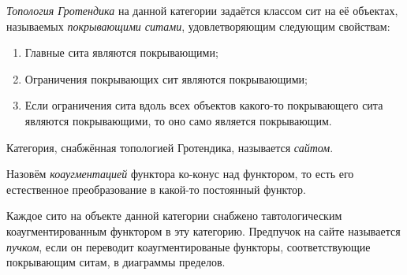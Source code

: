 \documentclass[
	extrafontsizes,
	11pt,
	hyphens,
]{memoir}
\begin{document}

\begin{definition}
\emph{Топология Гротендика} на данной категории задаётся классом сит на её объектах, называемых \emph{покрывающими ситами}, удовлетворяющим следующим свойствам:
\begin{enumerate}[
	font=\upshape,
	label=\asbuk*),
	ref=\asbuk*,
	]

\item Главные сита являются покрывающими;

\item Ограничения покрывающих сит являются покрывающими;

\item Если ограничения сита вдоль всех объектов какого-то покрывающего сита являются покрывающими, то оно само является покрывающим.

\end{enumerate}
\end{definition}

\begin{definition}
Категория, снабжённая топологией Гротендика, называется \emph{сайтом}.
\end{definition}

\begin{definition}
Назовём \emph{коаугментацией} функтора ко-конус над функтором, то есть его естественное преобразование в какой-то постоянный функтор.
\end{definition}

\begin{definition}
Каждое сито на объекте данной категории снабжено тавтологическим коаугментированным функтором в эту категорию.
Предпучок на сайте называется \emph{пучком}, если он переводит коаугментированые функторы, соответствующие покрывающим ситам, в диаграммы пределов.
\end{definition}


\end{document}
